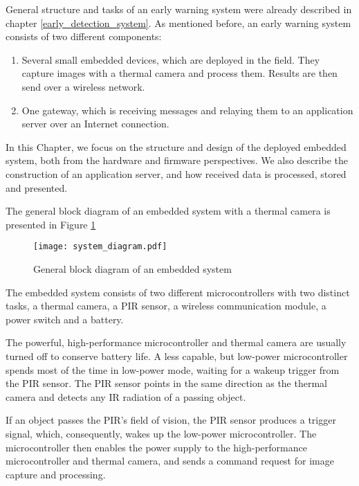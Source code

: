 General structure and tasks of an early warning system were already described in chapter \ref{early_detection_system}.
As mentioned before, an early warning system consists of two different components:

\begin{enumerate} 
    \item Several small embedded devices, which are deployed in the field. They capture images with a thermal camera and process them. Results are then send over a wireless network.
    \item One gateway, which is receiving messages and relaying them to an application server over an Internet connection.
\end{enumerate} 

In this Chapter, we focus on the structure and design of the deployed embedded system, both from the hardware and firmware perspectives.
We also describe the construction of an application server, and how received data is processed, stored and presented.

The general block diagram of an embedded system with a thermal camera is presented in Figure \ref{system_diagram} 

\begin{figure}[ht]
        \centering
        \texttt{[image: system\_diagram.pdf]} 
        \caption{ General block diagram of an embedded system}
        \label{system_diagram}
\end{figure}

The embedded system consists of two different microcontrollers with two distinct tasks, a thermal camera, a PIR sensor, a wireless communication module, a power switch and a battery.

The powerful, high-performance microcontroller and thermal camera are usually turned off to conserve battery life.
A less capable, but low-power microcontroller spends most of the time in low-power mode, waiting for a wakeup trigger from the PIR sensor.
The PIR sensor points in the same direction as the thermal camera and detects any IR radiation of a passing object.

If an object passes the PIR's field of vision, the PIR sensor produces a trigger signal, which, consequently, wakes up the low-power microcontroller.
The microcontroller then enables the power supply to the high-performance microcontroller and thermal camera, and sends a command request for image capture and processing.

